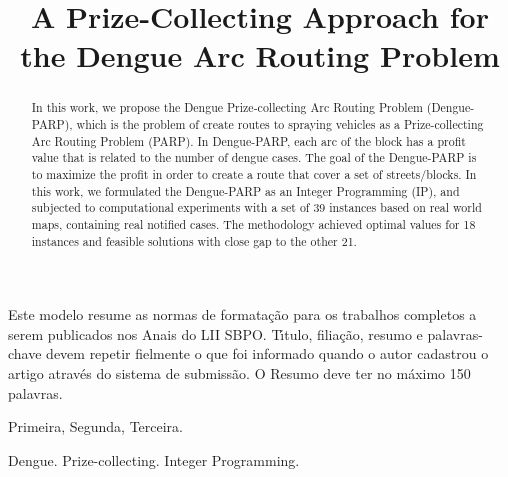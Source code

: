 \documentclass[a4paper,11pt]{article}
\begin{document}
\title{A Prize-Collecting Approach for the Dengue Arc Routing Problem} 

\maketitle
\thispagestyle{fancy}

\author{
}

\author{ 
}

\vspace{8mm}
\begin{resumo}
Este modelo resume as normas de formata\c c\~ao para os trabalhos completos a serem publicados
nos Anais do LII SBPO. T\'\i tulo, filia\c c\~ao, resumo e palavras-chave devem repetir fielmente
o que foi informado quando o autor cadastrou o artigo atrav\' es do sistema de submiss\~ao.
O Resumo deve ter no m\' aximo 150 palavras.
 \end{resumo}

\bigskip
\begin{palchaves}
Primeira, Segunda, Terceira.

\bigskip
{}
\end{palchaves}


\vspace{8mm}

\begin{abstract}
In this work, we propose the Dengue Prize-collecting Arc Routing Problem (Dengue-PARP), which is the problem of create routes to spraying vehicles as
a Prize-collecting Arc Routing Problem (PARP). In Dengue-PARP, each arc of the block has a profit value that is related to the number of dengue cases. The goal of the Dengue-PARP is to maximize the profit in order to create a route that cover a set of streets/blocks. In this work, we formulated the
Dengue-PARP as an Integer Programming (IP), and subjected to computational experiments with a set of 39 instances based on real world maps, containing real notified cases. The methodology achieved optimal values for 18 instances and feasible solutions with close gap to the other 21.
\end{abstract}

\bigskip
\begin{keywords}
Dengue. Prize-collecting. Integer Programming.

\bigskip
\end{keywords}
\end{document}
